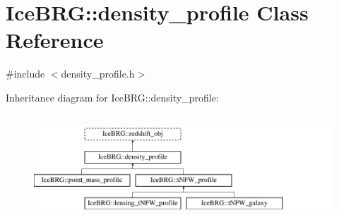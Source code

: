 \hypertarget{classIceBRG_1_1density__profile}{}\section{Ice\+B\+R\+G\+:\+:density\+\_\+profile Class Reference}
\label{classIceBRG_1_1density__profile}


{\ttfamily \#include $<$density\+\_\+profile.\+h$>$}

Inheritance diagram for Ice\+B\+R\+G\+:\+:density\+\_\+profile\+:\begin{figure}[H]
\begin{center}
\leavevmode
\includegraphics[height=3.950617cm]{classIceBRG_1_1density__profile}
\end{center}
\end{figure}
